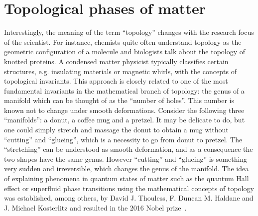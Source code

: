 %
%
\chapter{Topological phases of matter}
\label{ch:topological_phases_of_matter}
%
%
Interestingly, the meaning of the term ``topology'' changes with the research focus of the scientist.
For instance, chemists quite often understand topology as the geometric configuration of a molecule and biologists talk about the topology of knotted proteins.
A condensed matter physicist typically classifies certain structures, e.g. insulating materials or magnetic whirls, with the concepts of topological invariants.
This approach is closely related to one of the most fundamental invariants in the mathematical branch of topology: the genus of a manifold which can be thought of as the ``number of holes''.
This number is known not to change under smooth deformations.
Consider the following three ``manifolds'': a donut, a coffee mug and a pretzel.
It may be delicate to do, but one could simply stretch and massage the donut to obtain a mug without ``cutting'' and ``glueing'', which is a necessity to go from donut to pretzel.
The ``stretching'' can be understood as smooth deformation, and as a consequence the two shapes have the same genus.
However ``cutting'' and ``glueing'' is something very sudden and irreversible, which changes the genus of the manifold.
The idea of explaining phenomena in quantum states of matter such as the quantum Hall effect or superfluid phase transitions using the mathematical concepts of topology was established, among others, by David J. Thouless, F. Duncan M. Haldane and J. Michael Kosterlitz and resulted in the 2016 Nobel prize~\cite{NP2016}.

